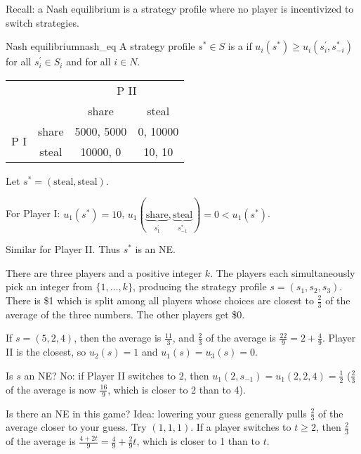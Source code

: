 \documentclass[12pt,letterpaper]{report}
\begin{document}
Recall: a Nash equilibrium is a strategy profile where no player is incentivized to switch
strategies.

\begin{defn}{Nash equilibrium}{nash_eq}
  A strategy profile $s^* \in S$ is a  if
  $u_i(s^*) \geq u_i(s_i^{\prime}, s_{-i}^*)$ for all $s_i^{\prime} \in S_i$ and for all $i \in N$.
\end{defn}

\begin{ex}
  \begin{center}
    \renewcommand{\arraystretch}{1.25}
    \begin{tabular}{c c |c|c|}
      \multicolumn{2}{c}{} & \multicolumn{2}{c}{P II} \\
      \multicolumn{2}{c}{} & \multicolumn{1}{c}{share} & \multicolumn{1}{c}{steal} \\
      \cline{3-4}
      \multirow{2}{*}{P I} & share & 5000, 5000 & 0, 10000 \\
      \cline{3-4}
      & steal & 10000, 0 & 10, 10 \\
      \cline{3-4}
    \end{tabular}
  \end{center}

  Let $s^* = (\text{steal}, \text{steal})$.

  For Player I: $u_1(s^*) = 10$,
  $u_1(\underbrace{\text{share}}_{s_1^{\prime}}, \underbrace{\text{steal}}_{s_{-1}^*})
    = 0 < u_1(s^*)$.

  Similar for Player II.
  Thus $s^*$ is an NE.
\end{ex}

\begin{ex}
  There are three players and a positive integer $k$.
  The players each simultaneously pick an integer from $\{1, \ldots, k\}$, producing the strategy
  profile $s = (s_1, s_2, s_3)$.
  There is \$1 which is split among all players whose choices are closest to $\frac{2}{3}$ of the
  average of the three numbers.
  The other players get \$0.

  If $s = (5, 2, 4)$, then the average is $\frac{11}{3}$, and $\frac{2}{3}$ of the average is
  $\frac{22}{9} = 2 + \frac{4}{9}$.
  Player II is the closest, so $u_2(s) = 1$ and $u_1(s) = u_3(s) = 0$.

  Is $s$ an NE?
  No: if Player II switches to 2, then $u_1(2, s_{-1}) = u_1(2, 2, 4) = \frac{1}{2}$ ($\frac{2}{3}$
  of the average is now $\frac{16}{9}$, which is closer to 2 than to 4).

  Is there an NE in this game?
  Idea: lowering your guess generally pulls $\frac{2}{3}$ of the average closer to your guess.
  Try $(1, 1, 1)$.
  If a player switches to $t \geq 2$, then $\frac{2}{3}$ of the average is
  $\frac{4 + 2t}{9} = \frac{4}{9} + \frac{2}{9}t$, which is closer to 1 than to $t$.
\end{ex}
\end{document}
